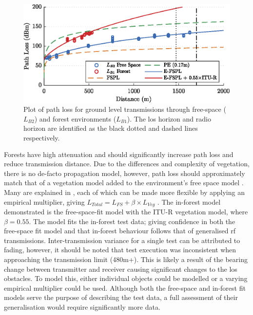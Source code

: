 \begin{figure}[H]
    \centering
   	\includegraphics{Figures/distance_pl_plot}
    \caption[Effect of Distance on ground level Path Loss]{
    	Plot of path loss for ground level transmissions through free-space ($L_{B2}$) and forest environments ($L_{B1}$). The \ac{los} horizon and radio horizon are identified as the black dotted and dashed lines respectively.
    }
    \label{fig:distance_pl_plot}
\end{figure}
\vspace{-5mm}
Forests have high attenuation and should significantly increase path loss and reduce transmission distance. Due to the differences and complexity of vegetation, there is no de-facto propagation model, however, path loss should approximately match that of a vegetation model added to the environment's free space model \cite{3YP:COMBINING_MODELS}.  Many are explained in \cite{3YP:PROP_MODELS}, each of which can be made more flexible by applying an empirical multiplier, giving $L_{Total} = L_{FS} + \beta \times L_{Veg}$ \cite{3YP:EMPIRICAL_MULTIPLIER}. The in-forest model demonstrated is the free-space-fit model with the ITU-R vegetation model, where $\beta=0.55$. The model fits the in-forest test data; giving confidence in both the free-space fit model and that in-forest behaviour follows that of generalised \ac{rf} transmissions. Inter-transmission variance for a single test can be attributed to fading, however, it should be noted that test execution was inconsistent when approaching the transmission limit (480m+). This is likely a result of the bearing change between transmitter and receiver causing significant changes to the \ac{los} obstacles. To model this, either individual objects could be modelled or a varying empirical multiplier could be used. Although both the free-space and in-forest fit models serve the purpose of describing the test data, a full assessment of their generalisation would require significantly more data.

